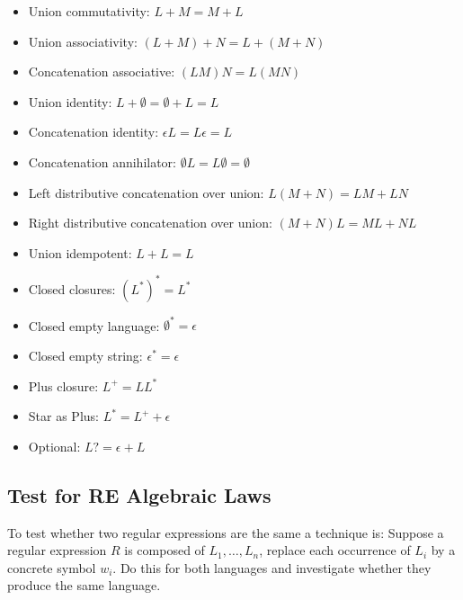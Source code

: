 \begin{itemize}
    \item Union commutativity: $L + M = M + L$
    \item Union associativity: $(L + M) + N = L + (M + N)$
    \item Concatenation associative: $(LM)N = L(MN)$
    \item Union identity: $L + \emptyset = \emptyset + L = L$
    \item Concatenation identity: $\epsilon L = L \epsilon = L$
    \item Concatenation annihilator: $\emptyset L = L \emptyset = \emptyset$
    \item Left distributive concatenation over union: $L(M + N) = LM + LN$
    \item Right distributive concatenation over union: $(M + N)L = ML + NL$
    \item Union idempotent: $L + L = L$
    \item Closed closures: $(L^*)^* = L^*$
    \item Closed empty language: $\emptyset^* = \epsilon$
    \item Closed empty string: $\epsilon^* = \epsilon$
    \item Plus closure: $L^+ = LL^*$
    \item Star as Plus: $L^* = L^+ + \epsilon$
    \item Optional: $L? = \epsilon + L$
\end{itemize}

\subsection{Test for RE Algebraic Laws}
To test whether two regular expressions are the same a technique is: Suppose a regular expression $R$ is composed of $L_1,\dots,L_n$, replace each occurrence of $L_i$ by a concrete symbol $w_i$. Do this for both languages and investigate whether they produce the same language. 

